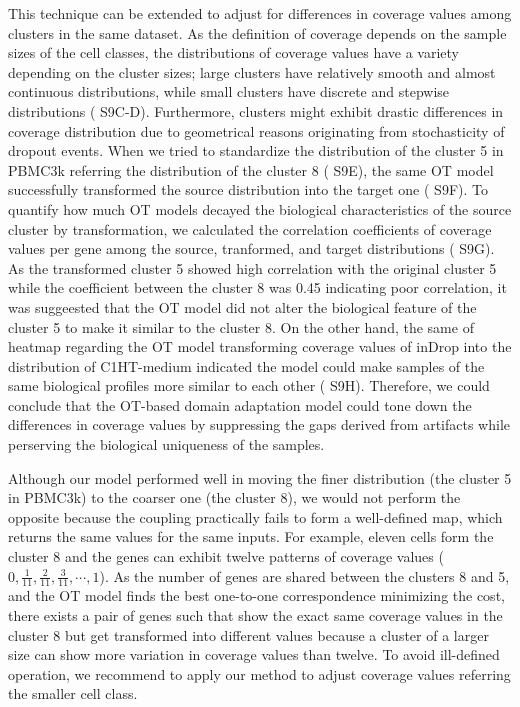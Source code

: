 \documentclass{article}
\begin{document}
This technique can be extended to adjust for differences in coverage values among clusters in the same dataset. 
As the definition of coverage depends on the sample sizes of the cell classes, the distributions of coverage values 
have a variety depending on the cluster sizes; large clusters have relatively smooth and almost continuous distributions, 
while small clusters have discrete and stepwise distributions (\figurename{ S9C-D}). Furthermore, clusters might exhibit 
drastic differences in coverage distribution due to geometrical reasons originating from stochasticity of dropout 
events. When we tried to standardize the distribution of the cluster 5 in PBMC3k referring the distribution of the 
cluster 8 (\figurename{ S9E}), the same OT model successfully transformed the source distribution into the target 
one (\figurename{ S9F}). To quantify how much OT models decayed the biological characteristics of the source cluster by 
transformation, we calculated the correlation coefficients of coverage values per gene among the source, tranformed, 
and target distributions (\figurename{ S9G}). As the transformed cluster 5 showed high correlation with the original cluster 
5 while the coefficient between the cluster 8 was 0.45 indicating poor correlation, it was suggeested that the OT 
model did not alter the biological feature of the cluster 5 to make it similar to the cluster 8. On the other hand, 
the same of heatmap regarding the OT model transforming coverage values of inDrop into the distribution of 
C1HT-medium indicated the model could make samples of the same biological profiles more similar to each other (\figurename{ S9H}). 
Therefore, we could conclude that the OT-based domain adaptation model could tone down the differences 
in coverage values by suppressing the gaps derived from artifacts while perserving the biological uniqueness of the 
samples.

Although our model performed well in moving the finer distribution (the cluster 5 in PBMC3k) to the coarser 
one (the cluster 8), we would not perform the opposite because the coupling practically fails to form a well-defined 
map, which returns the same values for the same inputs. For example, eleven cells form the cluster 8 and the genes 
can exhibit twelve patterns of coverage values ($0,\frac{1}{11},\frac{2}{11},\frac{3}{11},\cdots,1$). As the number of genes are shared between 
the clusters 8 and 5, and the OT model finds the best one-to-one correspondence minimizing the cost, there exists 
a pair of genes such that show the exact same coverage values in the cluster 8 but get transformed into different 
values because a cluster of a larger size can show more variation in coverage values than twelve. To avoid ill-defined 
operation, we recommend to apply our method to adjust coverage values referring the smaller cell class. 
\end{document}
